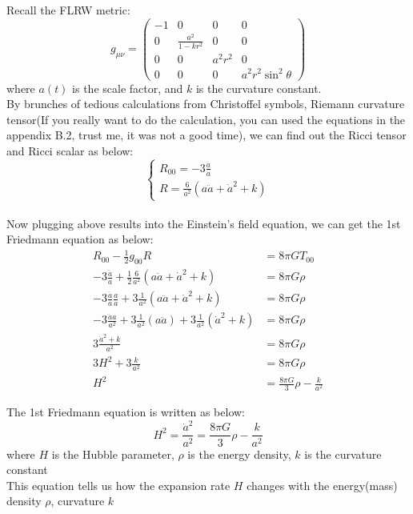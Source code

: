 \begin{foundation}
    Recall the FLRW metric:
    \[
        g_{\mu\nu} = \begin{pmatrix}
            -1 & 0 & 0 & 0 \\
            0 & \frac{a^2}{1-kr^2} & 0 & 0 \\
            0 & 0 & a^2 r^2 & 0 \\
            0 & 0 & 0 & a^2 r^2 \sin^2\theta
        \end{pmatrix}
    \]
    where $a(t)$ is the scale factor, and $k$ is the curvature constant. \\

    By brunches of tedious calculations from Christoffel symbols, Riemann curvature tensor(If you really want to do the calculation, you can used the equations in the appendix B.2, trust me, it was not a good time), we can find out the Ricci tensor and Ricci scalar as below:
    \[
        \begin{cases}
            R_{00} = -3\frac{\ddot{a}}{a} \\
            R = \frac{6}{a^2}\left( a \ddot{a} + \dot{a}^2 + k \right)
        \end{cases}
    \] \\

    Now plugging above results into the Einstein's field equation, we can get the 1st Friedmann equation as below: \\
    \begin{align*}
        R_{00} - \frac{1}{2}g_{00}R &= 8\pi G T_{00} \\
        -3\frac{\ddot{a}}{a} + \frac{1}{2}\frac{6}{a^2}\left( a \ddot{a} + \dot{a}^2 + k \right) &= 8\pi G \rho \\
        -3\frac{\ddot{a}}{a} \frac{a}{a} + 3\frac{1}{a^2}\left( a \ddot{a} + \dot{a}^2 + k \right) &= 8\pi G \rho \\
        -3\frac{\ddot{a}a}{a^2} + 3\frac{1}{a^2}\left(a\ddot{a}\right) + 3 \frac{1}{a^2}\left( \dot{a}^2 + k \right) &= 8\pi G \rho \\
        3\frac{\dot{a}^2 + k}{a^2} &= 8\pi G \rho \\
        3 H^2 + 3\frac{k}{a^2} &= 8\pi G \rho \\
        H^2 &= \frac{8\pi G}{3}\rho - \frac{k}{a^2}
    \end{align*}
\end{foundation}

\bigskip \noindent
\begin{theory}
    The 1st Friedmann equation is written as below:
    \[
        H^2 = \frac{\dot{a}^2}{a^2} = \frac{8\pi G}{3}\rho - \frac{k}{a^2}
    \]
    where $H$ is the Hubble parameter, $\rho$ is the energy density, $k$ is the curvature constant\\

    This equation tells us how the expansion rate $H$ changes with the energy(mass) density $\rho$, curvature $k$
\end{theory}


